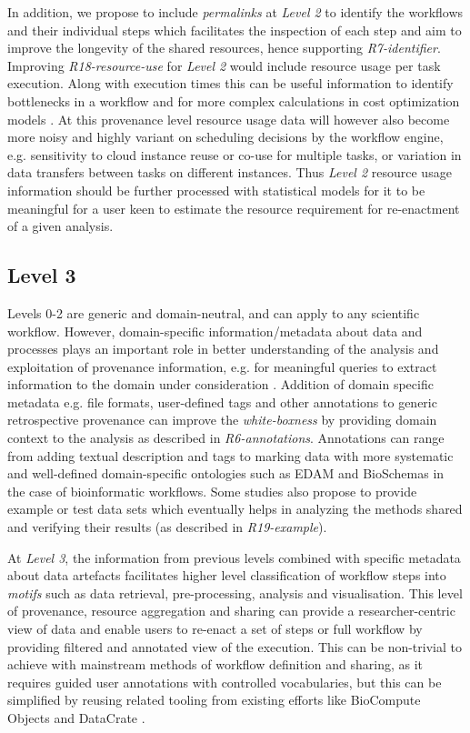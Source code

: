 \documentclass[a4paper,num-refs]{oup-contemporary}
\begin{document}
In addition, we propose to include \textit{permalinks} at \textit{Level 2} to identify the workflows and their individual steps which facilitates the inspection of each step and aim to improve the longevity of the shared resources, hence supporting \textit{R7-identifier}. Improving \textit{R18-resource-use} for \textit{Level 2} would include resource usage per task execution. Along with execution times this can be useful information to identify bottlenecks in a workflow and for more complex calculations in cost optimization models \citep{Malawski_2013}. At this provenance level resource usage data will however also become more noisy and highly variant on scheduling decisions by the workflow engine, e.g. sensitivity to cloud instance reuse or co-use for multiple tasks, or variation in data transfers between tasks on different instances. Thus \textit{Level 2} resource usage information should be further processed with statistical models for it to be meaningful for a user keen to estimate the resource requirement for re-enactment of a given analysis. 

\subsection{Level 3} \label{sec:level3}
Levels 0-2 are generic and domain-neutral, and can apply to any scientific workflow. However, domain-specific information/metadata about data and processes plays an important role in better understanding of the analysis and exploitation of provenance information, e.g. for meaningful queries to extract information to the domain under consideration \citep{Alper2018, Gaignard2014}. Addition of domain specific metadata e.g. file formats, user-defined tags and other annotations to generic retrospective provenance can improve the \textit{white-boxness} by providing domain context to the analysis as described in \textit{R6-annotations}. Annotations can range from adding textual description and tags to marking data with more systematic and well-defined domain-specific ontologies such as EDAM \citep{Ison2013} and BioSchemas \citep{Michel_2018} in the case of bioinformatic workflows. Some studies also propose to provide example or test data sets which eventually helps in analyzing the methods shared and verifying their results (as described in \textit{R19-example}).

At \textit{Level 3}, the information from previous levels combined with specific metadata about data artefacts facilitates higher level classification of workflow steps into \textit{motifs} \citep{garijo_2014} such as data retrieval, pre-processing, analysis and visualisation. This level of provenance, resource aggregation and sharing can provide a researcher-centric view of data and enable users to re-enact a set of steps or full workflow by providing filtered and annotated view of the execution. This can be non-trivial to achieve with mainstream methods of workflow definition and sharing, as it requires guided user annotations with controlled vocabularies, but this can be simplified by reusing related tooling from existing efforts like BioCompute Objects \citep{Alterovitz2019} and DataCrate \citep{datacrate_2018}. 
\end{document}
